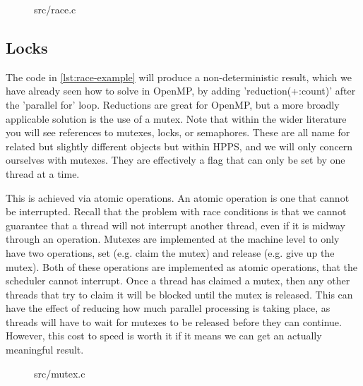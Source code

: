 \begin{figure}
  
  {src/race.c}
\end{figure}
  
\subsection{Locks}

The code in \ref{lst:race-example} will produce a non-deterministic result, which we have already seen how to solve in OpenMP, by adding 'reduction(+:count)' after the 'parallel for' loop. Reductions are great for OpenMP, but a more broadly applicable solution is the use of a mutex. Note that within the wider literature you will see references to mutexes, locks, or semaphores. These are all name for related but slightly different objects but within HPPS, and we will only concern ourselves with mutexes. They are effectively a flag that can only be set by one thread at a time. 

This is achieved via atomic operations. An atomic operation is one that cannot be interrupted. Recall that the problem with race conditions is that we cannot guarantee that a thread will not interrupt another thread, even if it is midway through an operation. Mutexes are implemented at the machine level to only have two operations, set (e.g. claim the mutex) and release (e.g. give up the mutex). Both of these operations are implemented as atomic operations, that the scheduler cannot interrupt. Once a thread has claimed a mutex, then any other threads that try to claim it will be blocked until the mutex is released. This can have the effect of reducing how much parallel processing is taking place, as threads will have to wait for mutexes to be released before they can continue. However, this cost to speed is worth it if it means we can get an actually meaningful result.

\begin{figure}
  
  {src/mutex.c}
\end{figure}

